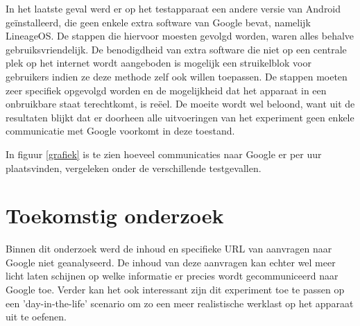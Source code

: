 \documentclass[a0,portrait]{a0poster}
\begin{document}
\begin{multicols}{2}
In het laatste geval werd er op het testapparaat een andere versie van Android geïnstalleerd, die geen enkele extra software van Google bevat, namelijk LineageOS. De stappen die hiervoor moesten gevolgd worden, waren alles behalve gebruiksvriendelijk. De benodigdheid van extra software die niet op een centrale plek op het internet wordt aangeboden is mogelijk een struikelblok voor gebruikers indien ze deze methode zelf ook willen toepassen. De stappen moeten zeer specifiek opgevolgd worden en de mogelijkheid dat het apparaat in een onbruikbare staat terechtkomt, is reëel. De moeite wordt wel beloond, want uit de resultaten blijkt dat er doorheen alle uitvoeringen van het experiment geen enkele communicatie met Google voorkomt in deze toestand.

In figuur \ref{grafiek} is te zien hoeveel communicaties naar Google er per uur plaatsvinden, vergeleken onder de verschillende testgevallen.
\color{HoGentAccent1}
\section*{Toekomstig onderzoek}
\color{black}

Binnen dit onderzoek werd de inhoud en specifieke URL van aanvragen naar Google niet geanalyseerd. De inhoud van deze aanvragen kan echter wel meer licht laten schijnen op welke informatie er precies wordt gecommuniceerd naar Google toe. Verder kan het ook interessant zijn dit experiment toe te passen op een 'day-in-the-life' scenario om zo een meer realistische werklast op het apparaat uit te oefenen.



\end{multicols}
\end{document}
